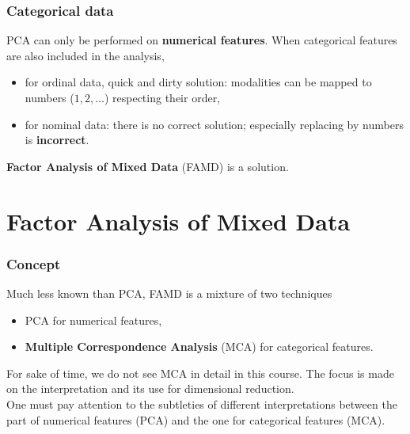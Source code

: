\begin{frame}
\frametitle{Categorical data}
PCA can only be performed on {\bf numerical features}. When categorical features are also included in the analysis,
\begin{itemize}
\item for ordinal data, quick and dirty solution: modalities can be mapped to numbers ($1,2,\ldots$) respecting their order,
\item for nominal data: there is no correct solution; especially replacing by numbers is {\bf incorrect}.
\end{itemize}
{\bf Factor Analysis of Mixed Data} (FAMD) is a solution. 
\end{frame}
\section{Factor Analysis of Mixed Data}
\begin{frame}
\frametitle{Concept}
Much less known than PCA, FAMD is a mixture of two techniques
\begin{itemize}
\item PCA for numerical features,
\item {\bf Multiple Correspondence Analysis} (MCA) for categorical features.
\end{itemize}
For sake of time, we do not see MCA in detail in this course. The focus is made on the interpretation and its use for dimensional reduction. \\
\vspace{0.3cm}
One must pay attention to the subtleties of different interpretations between the part of numerical features (PCA) and the one for categorical features (MCA). 
\end{frame}
